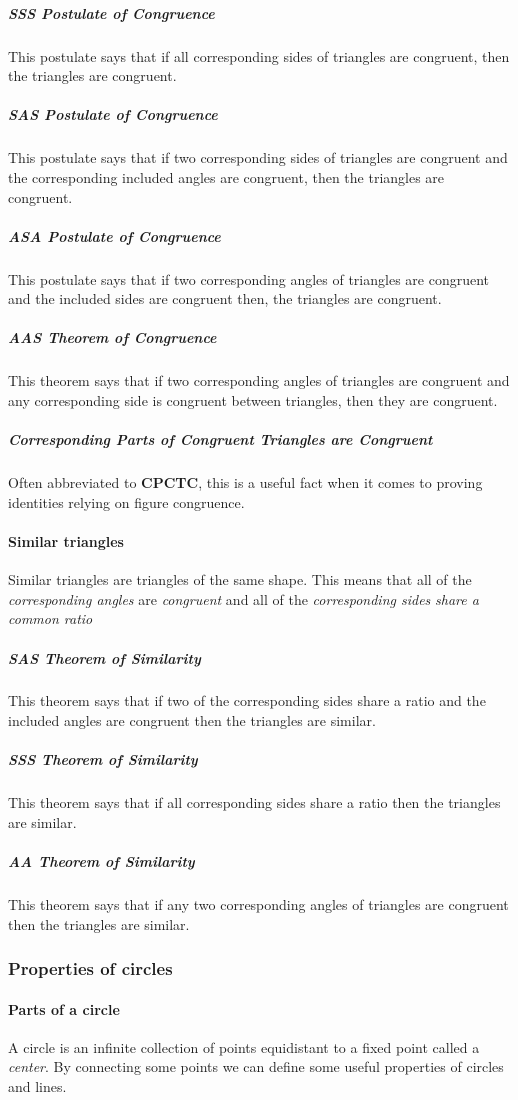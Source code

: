 \subparagraph{SSS Postulate of Congruence}
This postulate says that if all corresponding sides of triangles are congruent, then the triangles are congruent.

\subparagraph{SAS Postulate of Congruence}
This postulate says that if two corresponding sides of triangles are congruent and the corresponding included angles are congruent, then the triangles are congruent.

\subparagraph{ASA Postulate of Congruence}
This postulate says that if two corresponding angles of triangles are congruent and the included sides are congruent then, the triangles are congruent.

\subparagraph{AAS Theorem of Congruence}
This theorem says that if two corresponding angles of triangles are congruent and any corresponding side is congruent between triangles, then they are congruent.

\subparagraph{Corresponding Parts of Congruent Triangles are Congruent}
Often abbreviated to \textbf{CPCTC}, this is a useful fact when it comes to proving identities relying on figure congruence.

\paragraph{Similar triangles}
Similar triangles are triangles of the same shape.
This means that all of the \emph{corresponding angles} are \emph{congruent} and all of the \emph{corresponding sides} \emph{share a common ratio}

\subparagraph{SAS Theorem of Similarity}
This theorem says that if two of the corresponding sides share a ratio and the included angles are congruent then the triangles are similar.

\subparagraph{SSS Theorem of Similarity}
This theorem says that if all corresponding sides share a ratio then the triangles are similar.

\subparagraph{AA Theorem of Similarity}
This theorem says that if any two corresponding angles of triangles are congruent then the triangles are similar.

\subsubsection{Properties of circles}
\paragraph{Parts of a circle}
A circle is an infinite collection of points equidistant to a fixed point called a \emph{center}.
By connecting some points we can define some useful properties of circles and lines.

